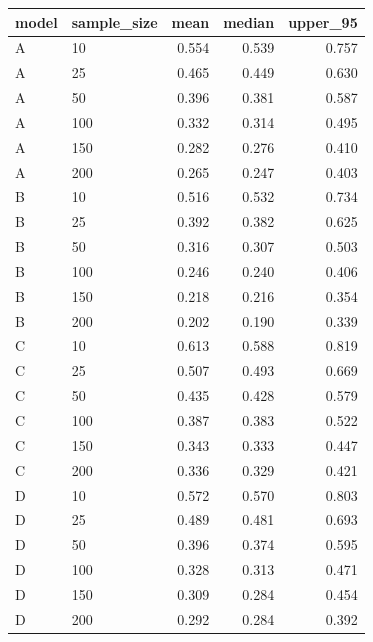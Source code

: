 
\begin{tabular}{llrrr}
\toprule
model & sample\_size & mean & median & upper\_95\\
\midrule
A & 10 & 0.554 & 0.539 & 0.757\\
A & 25 & 0.465 & 0.449 & 0.630\\
A & 50 & 0.396 & 0.381 & 0.587\\
A & 100 & 0.332 & 0.314 & 0.495\\
A & 150 & 0.282 & 0.276 & 0.410\\
\addlinespace
A & 200 & 0.265 & 0.247 & 0.403\\
B & 10 & 0.516 & 0.532 & 0.734\\
B & 25 & 0.392 & 0.382 & 0.625\\
B & 50 & 0.316 & 0.307 & 0.503\\
B & 100 & 0.246 & 0.240 & 0.406\\
\addlinespace
B & 150 & 0.218 & 0.216 & 0.354\\
B & 200 & 0.202 & 0.190 & 0.339\\
C & 10 & 0.613 & 0.588 & 0.819\\
C & 25 & 0.507 & 0.493 & 0.669\\
C & 50 & 0.435 & 0.428 & 0.579\\
\addlinespace
C & 100 & 0.387 & 0.383 & 0.522\\
C & 150 & 0.343 & 0.333 & 0.447\\
C & 200 & 0.336 & 0.329 & 0.421\\
D & 10 & 0.572 & 0.570 & 0.803\\
D & 25 & 0.489 & 0.481 & 0.693\\
\addlinespace
D & 50 & 0.396 & 0.374 & 0.595\\
D & 100 & 0.328 & 0.313 & 0.471\\
D & 150 & 0.309 & 0.284 & 0.454\\
D & 200 & 0.292 & 0.284 & 0.392\\
\bottomrule
\end{tabular}
